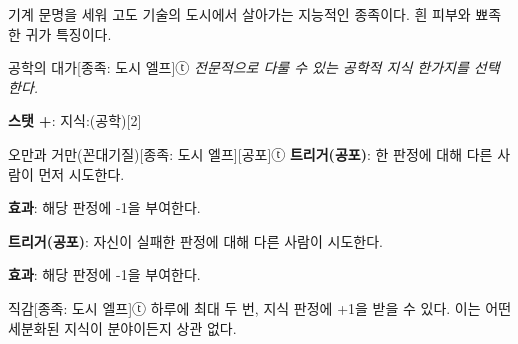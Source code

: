 \documentclass{report}
\begin{document}
	기계 문명을 세워 고도 기술의 도시에서 살아가는 지능적인 종족이다. 흰 피부와 뾰족한 귀가 특징이다.
	
	\begin{story}{공학의 대가}{[종족: 도시 엘프]ⓣ}
		\textit{전문적으로 다룰 수 있는 공학적 지식 한가지를 선택한다.}
		
		\textbf{스탯 +}: 지식:(공학)[2]
		
	\end{story}
	
	\begin{story}{오만과 거만(꼰대기질)}{[종족: 도시 엘프][공포]ⓣ}
		\textbf{트리거(공포)}: 한 판정에 대해 다른 사람이 먼저 시도한다.
		
		\textbf{효과}: 해당 판정에 -1을 부여한다.
		
		\medskip
		
		\textbf{트리거(공포)}: 자신이 실패한 판정에 대해 다른 사람이 시도한다.
		
		\textbf{효과}: 해당 판정에 -1을 부여한다.
		
	\end{story}
	
	\begin{story}{직감}{[종족: 도시 엘프]ⓣ}
		하루에 최대 두 번, 지식 판정에 +1을 받을 수 있다. 이는 어떤 세분화된 지식이 분야이든지 상관 없다.
		
	\end{story}
\end{document}
